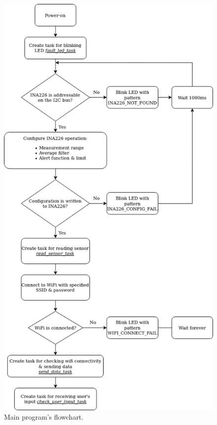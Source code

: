 \documentclass[../main.tex]{subfiles}
\begin{document}
    \begin{figure}[!h]
        \centerline{\includegraphics[scale=0.56]{media/main_program_flowchart.drawio.png}}
        \caption{Main program's flowchart.}
        \label{fig:main_program_flowchart}
    \end{figure}
\end{document}
